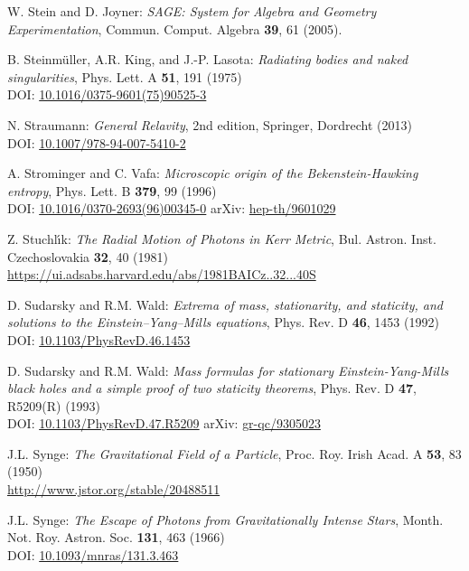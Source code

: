 \begin{thebibliography}{123}
W. Stein and D. Joyner:
{\em SAGE: System for Algebra and Geometry Experimentation},
Commun. Comput. Algebra {\bf 39}, 61 (2005).

B. Steinmüller, A.R. King, and J.-P. Lasota:
{\em Radiating bodies and naked singularities},
Phys. Lett. A {\bf 51}, 191 (1975)\\
DOI: \href{https://doi.org/10.1016/0375-9601(75)90525-3}{10.1016/0375-9601(75)90525-3}

N. Straumann:
{\em General Relavity}, 2nd edition,
Springer, Dordrecht (2013)\\
DOI: \href{https://doi.org/10.1007/978-94-007-5410-2}{10.1007/978-94-007-5410-2}

A. Strominger and C. Vafa:
{\em Microscopic origin of the Bekenstein-Hawking entropy},
Phys. Lett. B {\bf 379}, 99 (1996)\\
DOI: \href{https://doi.org/10.1016/0370-2693(96)00345-0}{10.1016/0370-2693(96)00345-0}\hfill
arXiv: \href{https://arxiv.org/abs/hep-th/9601029}{hep-th/9601029}

Z. Stuchl\'{\i}k: {\em The Radial Motion of Photons in Kerr Metric},
Bul. Astron. Inst. Czechoslovakia {\bf 32}, 40 (1981)\\
\url{https://ui.adsabs.harvard.edu/abs/1981BAICz..32...40S}

D. Sudarsky and R.M. Wald: {\em Extrema of mass, stationarity, and staticity,
and solutions to the Einstein–Yang–Mills equations},
Phys. Rev. D {\bf 46}, 1453 (1992)\\
DOI: \href{https://doi.org/10.1103/PhysRevD.46.1453}{10.1103/PhysRevD.46.1453}

D. Sudarsky and R.M. Wald:
{\em Mass formulas for stationary Einstein-Yang-Mills black holes and a simple proof of two staticity theorems},
Phys. Rev. D {\bf 47}, R5209(R) (1993)\\
DOI: \href{https://doi.org/10.1103/PhysRevD.47.R5209}{10.1103/PhysRevD.47.R5209}\hfill
arXiv: \href{https://arxiv.org/abs/gr-qc/9305023}{gr-qc/9305023}

J.L. Synge: {\em The Gravitational Field of a Particle},
Proc. Roy. Irish Acad. A {\bf 53}, 83 (1950)\\
\url{http://www.jstor.org/stable/20488511}

J.L. Synge: {\em The Escape of Photons from Gravitationally Intense Stars},
Month. Not. Roy. Astron. Soc. {\bf 131}, 463 (1966)\\
DOI: \href{https://doi.org/10.1093/mnras/131.3.463}{10.1093/mnras/131.3.463}


\end{thebibliography}
